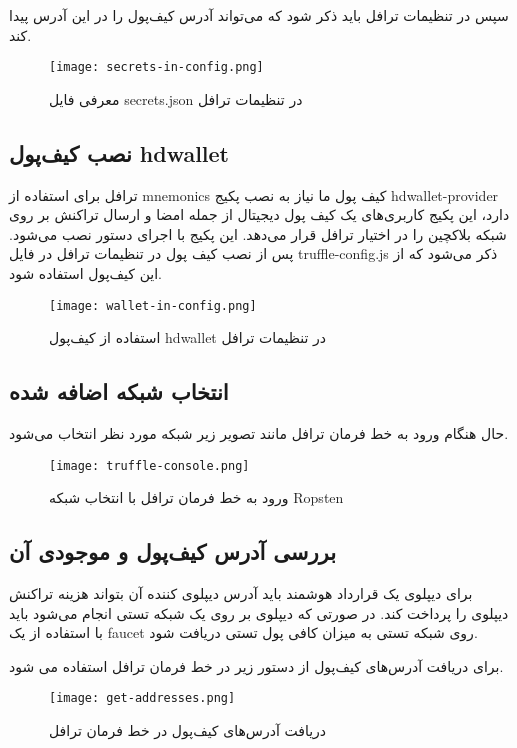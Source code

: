 سپس در تنظیمات ترافل باید ذکر شود که می‌تواند آدرس کیف‌پول را در این آدرس پیدا کند.

\begin{figure}[ht]
\centerline{\texttt{[image: secrets-in-config.png]}}
\caption{معرفی فایل secrets.json در تنظیمات ترافل}
\label{fig:secrets-in-config}
\end{figure}


\subsection{نصب کیف‌پول hdwallet}
ترافل برای استفاده از mnemonics کیف پول ما نیاز به نصب پکیج hdwallet-provider دارد، این پکیج کاربری‌های یک کیف پول دیجیتال از جمله امضا و ارسال تراکنش بر روی شبکه بلاکچین را در اختیار ترافل قرار می‌دهد. این پکیج با اجرای دستور
نصب می‌شود.  پس از نصب کیف پول در تنظیمات ترافل در فایل truffle-config.js ذکر می‌شود که از این کیف‌پول استفاده شود.

\begin{figure}[ht]
\centerline{\texttt{[image: wallet-in-config.png]}}
\caption{استفاده از کیف‌پول hdwallet در تنظیمات ترافل}
\label{fig:wallet-in-config}
\end{figure}


\subsection{انتخاب شبکه اضافه شده}
حال هنگام ورود به خط فرمان ترافل مانند تصویر زیر شبکه مورد نظر انتخاب می‌شود.

\begin{figure}[ht]
\centerline{\texttt{[image: truffle-console.png]}}
\caption{ورود به خط فرمان ترافل با انتخاب شبکه Ropsten}
\label{fig:truffle-console}
\end{figure}


\subsection{بررسی آدرس کیف‌پول و موجودی آن}
برای دیپلوی یک قرارداد هوشمند باید آدرس دیپلوی کننده آن بتواند هزینه تراکنش دیپلوی را پرداخت کند. در صورتی که دیپلوی بر روی یک شبکه تستی انجام می‌شود باید با استفاده از یک faucet روی شبکه تستی به میزان کافی پول تستی دریافت شود.

برای دریافت آدرس‌های کیف‌پول از دستور زیر در خط فرمان ترافل استفاده می شود.

\begin{figure}[ht]
\centerline{\texttt{[image: get-addresses.png]}}
\caption{دریافت آدرس‌های کیف‌پول در خط فرمان ترافل}
\label{fig:get-addresses}
\end{figure}


